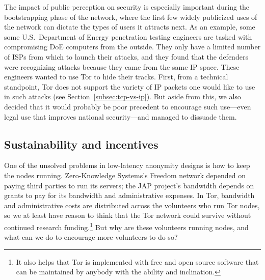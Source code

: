 \documentclass{llncs}
\begin{document}
The impact of public perception on security is especially important
during the bootstrapping phase of the network, where the first few
widely publicized uses of the network can dictate the types of users it
attracts next.
As an example, some some U.S.~Department of Energy
penetration testing engineers are tasked with compromising DoE computers
from the outside. They only have a limited number of ISPs from which to
launch their attacks, and they found that the defenders were recognizing
attacks because they came from the same IP space. These engineers wanted
to use Tor to hide their tracks. First, from a technical standpoint,
Tor does not support the variety of IP packets one would like to use in
such attacks (see Section~\ref{subsec:tcp-vs-ip}). But aside from this,
we also decided that it would probably be poor precedent to encourage
such use---even legal use that improves national security---and managed
to dissuade them.


\subsection{Sustainability and incentives}
One of the unsolved problems in low-latency anonymity designs is
how to keep the nodes running.  Zero-Knowledge Systems's Freedom network
depended on paying third parties to run its servers; the JAP project's
bandwidth depends on grants to pay for its bandwidth and
administrative expenses.  In Tor, bandwidth and administrative costs are
distributed across the volunteers who run Tor nodes, so we at least have
reason to think that the Tor network could survive without continued research
funding.\footnote{It also helps that Tor is implemented with free and open
  source software that can be maintained by anybody with the ability and
  inclination.}  But why are these volunteers running nodes, and what can we
do to encourage more volunteers to do so?
\end{document}
